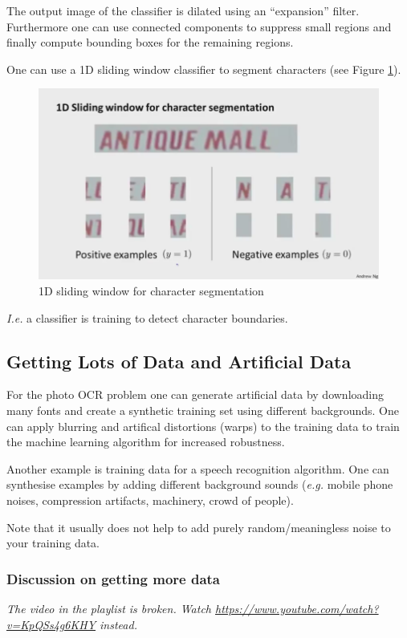 \documentclass[a4paper,twoside,10pt]{article}
\begin{document}
The output image of the classifier is dilated using an ``expansion'' filter. Furthermore one can use connected components to suppress small regions and finally compute bounding boxes for the remaining regions.

One can use a 1D sliding window classifier to segment characters (see Figure \ref{fig:charseg}).
\begin{figure}[htbp]
  \begin{center}
    \includegraphics[width=.6\textwidth]{charseg}
    \caption{1D sliding window for character segmentation\citep{andrewng}\label{fig:charseg}}
  \end{center}
\end{figure}
\emph{I.e.} a classifier is training to detect character boundaries.

\subsection{Getting Lots of Data and Artificial Data}
For the photo \ac{OCR} problem one can generate artificial data by downloading many fonts and create a synthetic training set using different backgrounds.
One can apply blurring and artifical distortions (warps) to the training data to train the machine learning algorithm for increased robustness.

Another example is training data for a speech recognition algorithm. One can synthesise examples by adding different background sounds (\emph{e.g.} mobile phone noises, compression artifacts, machinery, crowd of people).

Note that it usually does not help to add purely random/meaningless noise to your training data.

\subsubsection{Discussion on getting more data}
\begin{footnotesize}
  \emph{The video in the playlist is broken. Watch \url{https://www.youtube.com/watch?v=KpQSs4g6KHY} instead.}
\end{footnotesize}
\end{document}
